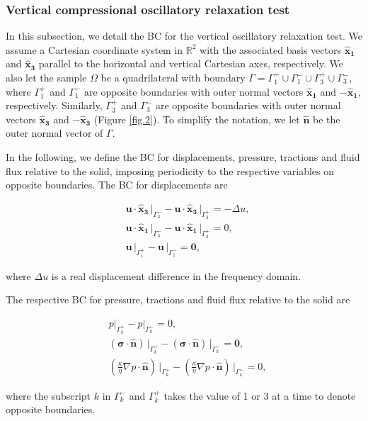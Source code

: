 \documentclass[draft]{agujournal2019}
\begin{document}
\subsubsection{Vertical compressional oscillatory relaxation test}
In this subsection, we detail the BC for the vertical oscillatory relaxation test. We assume a Cartesian coordinate system in $\mathbb R^2$ with the associated basis vectors $\bm{\hat x_1}$ and $\bm{\hat x_3}$ parallel to the horizontal and vertical Cartesian axes, respectively. We also
let the sample $\Omega$ be a quadrilateral with boundary $\Gamma = \Gamma_1^+ \cup \Gamma_1^- \cup \Gamma_3^+ \cup \Gamma_3^- $, where $\Gamma_1^+ $ and $\Gamma_1^- $ are opposite boundaries with outer normal vectors $\bm{\hat x_1}$ and $ -\bm{\hat x_1}$, respectively. Similarly, $\Gamma_3^+ $ and $\Gamma_3^- $ are opposite boundaries with outer normal vectors $\bm{\hat x_3}$ and $ -\bm{\hat x_3}$ (Figure \ref{fig.2}). To simplify the notation, we let $ \bm{\hat n}$ be the outer normal vector
of $\Gamma$.

In the following, we define the BC for displacements, pressure, tractions and fluid flux relative to the solid, imposing periodicity to the respective variables on opposite boundaries. 
The BC for displacements are

\begin{linenomath*}
\begin{equation}\label{Eq.8}
\begin{split}
&  \bm{u} \cdot \bm{\hat{x}_3} \, \vert_{\Gamma_3^-} - \bm{u}\cdot \bm{\hat{x}_3}\, \vert_{\Gamma_3^+} =- \Delta u, \\
&  \bm{u} \cdot \bm{\hat{x}_1}\, \vert_{\Gamma_3^-} - \bm{u} \cdot \bm{\hat{x}_1} \, \vert_{\Gamma_3^+} = 0, \\
& \bm{u}\,\vert_{\Gamma_1^+} - \bm{u}\,\vert_{\Gamma_1^-} = \bm{0},
\end{split}
\end{equation}
\end{linenomath*}
where $\Delta u$ is a real displacement difference in the frequency domain.

The respective BC for pressure, tractions and fluid flux relative to the solid are
\begin{linenomath*}
\begin{equation}\label{Eq.9}
\begin{split}
& p\vert_{\Gamma_k^+}-p\vert_{\Gamma_k^-} =0, \\
& \left(\bm{\sigma}\cdot \bm{\hat n} \right)\, \vert_{\Gamma_k^+}-\left(\bm{\sigma}\cdot \bm{\hat n} \right)\, \vert_{\Gamma_k^-} = \bm{0},\\
&\left( \frac{\kappa}{\eta} \nabla p \cdot \bm{\hat n} \right) \, \vert_{\Gamma_k^+} -\left( \frac{\kappa}{\eta} \nabla p \cdot \bm{\hat n} \right) \, \vert_{\Gamma_k^-} = 0,
\end{split}
\end{equation}
\end{linenomath*}
where the subscript $k$ in $\Gamma_k^-$ and $\Gamma_k^+$ takes the value of 1 or 3 at a time to denote opposite boundaries.
\end{document}
